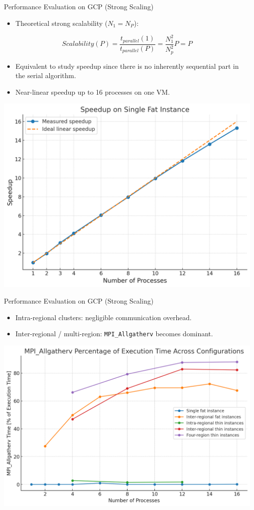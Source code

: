 \documentclass{beamer}
\begin{document}
\begin{frame}{Performance Evaluation on GCP (Strong Scaling)}
\begin{itemize}
\item Theoretical strong scalability ($N_1=N_P$):
\end{itemize}
\[
Scalability(P) = \frac{t_{parallel}(1)}{t_{parallel}(P)} = \frac{N_1^2}{N_p^2}P = P
\]
\begin{itemize}
	\item Equivalent to study speedup since there is no inherently sequential part in the serial algorithm.
	\item Near-linear speedup up to 16 processes on one VM.
\end{itemize}
\vspace{0.5em}
\centering
\includegraphics[width=0.5\linewidth]{parallel_strong_scaling_16_cores.png}
\end{frame}

\begin{frame}{Performance Evaluation on GCP (Strong Scaling)}
  \begin{itemize}
    \item Intra-regional clusters: negligible communication overhead.
    \item Inter-regional / multi-region: \texttt{MPI\_Allgatherv} becomes dominant.
  \end{itemize}
  \centering
  \includegraphics[width=0.85\linewidth]{communication_fraction_ex_time.png}
\end{frame}
\end{document}
